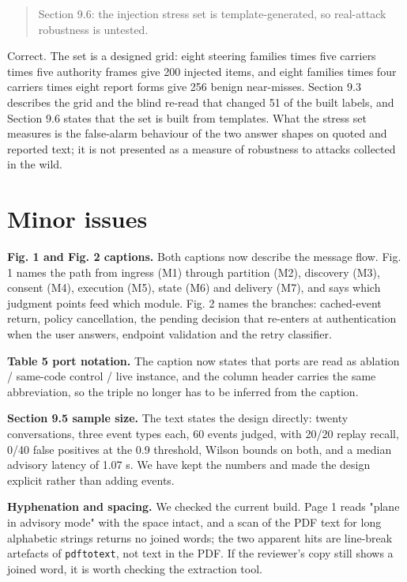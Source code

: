 \documentclass[11pt,a4paper]{article}
\begin{document}
\begin{quote}\small Section 9.6: the injection stress set is template-generated, so real-attack robustness is untested.\end{quote}
Correct. The set is a designed grid: eight steering families times five carriers times five authority frames give 200 injected items, and eight families times four carriers times eight report forms give 256 benign near-misses. Section 9.3 describes the grid and the blind re-read that changed 51 of the built labels, and Section 9.6 states that the set is built from templates. What the stress set measures is the false-alarm behaviour of the two answer shapes on quoted and reported text; it is not presented as a measure of robustness to attacks collected in the wild.

\section*{Minor issues}
\textbf{Fig. 1 and Fig. 2 captions.} Both captions now describe the message flow. Fig. 1 names the path from ingress (M1) through partition (M2), discovery (M3), consent (M4), execution (M5), state (M6) and delivery (M7), and says which judgment points feed which module. Fig. 2 names the branches: cached-event return, policy cancellation, the pending decision that re-enters at authentication when the user answers, endpoint validation and the retry classifier.

\textbf{Table 5 port notation.} The caption now states that ports are read as ablation / same-code control / live instance, and the column header carries the same abbreviation, so the triple no longer has to be inferred from the caption.

\textbf{Section 9.5 sample size.} The text states the design directly: twenty conversations, three event types each, 60 events judged, with 20/20 replay recall, 0/40 false positives at the 0.9 threshold, Wilson bounds on both, and a median advisory latency of 1.07 s. We have kept the numbers and made the design explicit rather than adding events.

\textbf{Hyphenation and spacing.} We checked the current build. Page 1 reads "plane in advisory mode" with the space intact, and a scan of the PDF text for long alphabetic strings returns no joined words; the two apparent hits are line-break artefacts of \texttt{pdftotext}, not text in the PDF. If the reviewer's copy still shows a joined word, it is worth checking the extraction tool.
\end{document}
